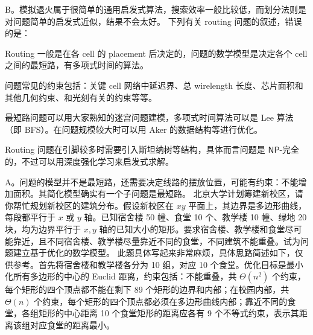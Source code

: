 \begin{problems}
\begin{choices}
        \end{choices}
        \sol B。模拟退火属于很简单的通用启发式算法，搜索效率一般比较低，而划分法则是对问题简单的启发式近似，结果不会太好。
        \pro 下列有关 routing 问题的叙述，错误的是：
        \begin{choices}
            \item Routing 一般是在各 cell 的 placement 后决定的，问题的数学模型是决定各个 cell 之间的最短路，有多项式时间的算法。
            \item 问题常见的约束包括：关键 cell 网络中延迟界、总 wirelength 长度、芯片面积和其他几何约束、和光刻有关的约束等等。
            \item 最短路问题可以用大家熟知的迷宫问题建模，多项式时间算法可以是 Lee 算法（即 BFS）。在问题规模较大时可以用 Aker 的数据结构等进行优化。
            \item Routing 问题在引脚较多时需要引入斯坦纳树等结构，具体而言问题是 $\mathsf{NP}$-完全的，不过可以用深度强化学习来启发式求解。
        \end{choices}
        \sol A。问题的模型并不是最短路，还需要决定线路的摆放位置，可能有约束：不能增加面积。其简化模型确实有一个子问题是最短路。
        \pro 北京大学计划筹建新校区，请你帮忙规划新校区的建筑分布。假设新校区在 $xy$ 平面上，其边界是多边形曲线，每段都平行于 $x$ 或 $y$ 轴。已知宿舍楼 50 幢、食堂 10 个、教学楼 10 幢、绿地 20 块，均为边界平行于 $x, y$ 轴的已知大小的矩形。要求宿舍楼、教学楼和食堂尽可能靠近，且不同宿舍楼、教学楼尽量靠近不同的食堂，不同建筑不能重叠。试为问题建立基于优化的数学模型。
        \sol 此题具体写起来非常麻烦，具体思路简述如下，仅供参考。首先将宿舍楼和教学楼各分为 10 组，对应 10 个食堂。优化目标是最小化所有多边形的中心的 Euclid 距离，约束包括：不能重叠，共 $\Theta(n^2)$ 个约束，每个矩形的四个顶点都不能在剩下 89 个矩形的边界和内部；在校园内部，共 $\Theta(n)$ 个约束，每个矩形的四个顶点都必须在多边形曲线内部；靠近不同的食堂，各组矩形的中心距离 10 个食堂矩形的距离应各有 9 个不等式约束，表示其距离该组对应食堂的距离最小。
    \end{problems}